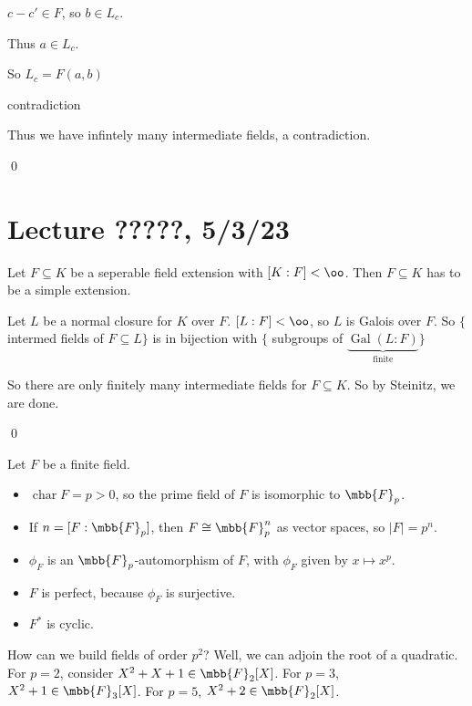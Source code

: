 \documentclass[x11names,reqno,14pt]{extarticle}
\DeclareMathOperator{\Gal}{Gal}
\DeclareMathOperator{\Char}{char}
\begin{document}
$c - c' \in F$, so $b \in L_c$. 

Thus $a \in L_c$. 

So $L_c = F(a, b)$

contradiction

Thus we have infintely many intermediate fields, a contradiction.

\qed



\section*{Lecture ?????, 5/3/23}

\cor

Let $F \subseteq K$ be a seperable field extension with $[K:F]<\oo$. Then $F\subseteq K$ has to be a simple extension. 

\proof

Let $L$ be a normal closure for $K$ over $F$. $[L:F]<\oo$, so $L$ is Galois over $F$. So $\{$intermed fields of $F \subseteq L\}$ is in bijection with $\{$ subgroups of $\underbrace{\Gal(L:F)}_{\text{finite}}\}$

So there are only finitely many intermediate fields for $F \subseteq K$. So by Steinitz, we are done.

\qed

Let $F$ be a finite field. 

\begin{itemize}

\item $\Char F = p > 0$, so the prime field of $F$ is isomorphic to $\mbb{F}_p$.

\item If $n = [F:\mbb{F}_p]$, then $F \cong \mbb{F}_p^n$ as vector spaces, so $|F| = p^n$. 

\item $\phi_F$ is an $\mbb{F}_p$-automorphism of $F$, with $\phi_F$ given by $x \mapsto x^p$.

\item $F$ is perfect, because $\phi_F$ is surjective. 

\item $F^*$ is cyclic. 

\end{itemize}

How can we build fields of order $p^2$? Well, we can adjoin the root of a quadratic. For $p = 2$, consider $X^2 + X + 1 \in \mbb{F}_2[X]$. For $p = 3$, $X^2 + 1 \in \mbb{F}_3[X]$. For $p = 5$, $X^2 + 2 \in \mbb{F}_2[X]$.
\end{document}
